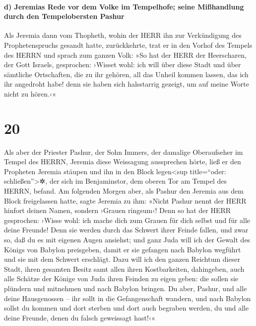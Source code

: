 \hypertarget{d-jeremias-rede-vor-dem-volke-im-tempelhofe-seine-miuxdfhandlung-durch-den-tempelobersten-pashur}{%
\paragraph{d) Jeremias Rede vor dem Volke im Tempelhofe; seine
Mißhandlung durch den Tempelobersten
Pashur}\label{d-jeremias-rede-vor-dem-volke-im-tempelhofe-seine-miuxdfhandlung-durch-den-tempelobersten-pashur}}

Als Jeremia dann vom Thopheth, wohin der HERR ihn zur
Verkündigung des Prophetenspruchs gesandt hatte, zurückkehrte, trat er
in den Vorhof des Tempels des HERRN und sprach zum ganzen Volk:
»So hat der HERR der Heerscharen, der Gott Israels,
gesprochen: ›Wisset wohl: ich will über diese Stadt und über sämtliche
Ortschaften, die zu ihr gehören, all das Unheil kommen lassen, das ich
ihr angedroht habe! denn sie haben sich halsstarrig gezeigt, um auf
meine Worte nicht zu hören.‹«

\hypertarget{section-19}{%
\section{20}\label{section-19}}

Als aber der Priester Pashur, der Sohn Immers, der
damalige Oberaufseher im Tempel des HERRN, Jeremia diese Weissagung
aussprechen hörte, ließ er den Propheten Jeremia stäupen
und ihn in den Block legen\textless sup title=``oder:
schließen''\textgreater✲, der sich im Benjaminstor, dem oberen Tor am
Tempel des HERRN, befand. Am folgenden Morgen aber, als
Pashur den Jeremia aus dem Block freigelassen hatte, sagte Jeremia zu
ihm: »Nicht Pashur nennt der HERR hinfort deinen Namen, sondern ›Grauen
ringsum‹! Denn so hat der HERR gesprochen: ›Wisse wohl:
ich mache dich zum Grauen für dich selbst und für alle deine Freunde!
Denn sie werden durch das Schwert ihrer Feinde fallen, und zwar so, daß
du es mit eigenen Augen ansiehst; und ganz Juda will ich der Gewalt des
Königs von Babylon preisgeben, damit er sie gefangen nach Babylon
wegführt und sie mit dem Schwert erschlägt. Dazu will ich
den ganzen Reichtum dieser Stadt, ihren gesamten Besitz samt allen ihren
Kostbarkeiten, dahingeben, auch alle Schätze der Könige von Juda ihren
Feinden zu eigen geben: die sollen sie plündern und mitnehmen und nach
Babylon bringen. Du aber, Pashur, und alle deine
Hausgenossen -- ihr sollt in die Gefangenschaft wandern, und nach
Babylon sollst du kommen und dort sterben und dort auch begraben werden,
du und alle deine Freunde, denen du falsch geweissagt hast!‹«

